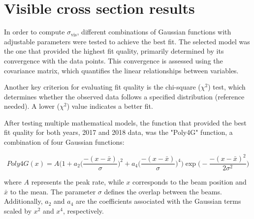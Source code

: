 \section{Visible cross section results}
\label{Visible cross section results}

In order to compute $\sigma_{\text{vis}}$, different combinations of Gaussian functions with adjustable parameters were tested to achieve the best fit. The selected model was the one that provided the highest fit quality, primarily determined by its convergence with the data points. This convergence is assessed using the covariance matrix, which quantifies the linear relationships between variables.

Another key criterion for evaluating fit quality is the chi-square ($\chi^2$) test, which determines whether the observed data follows a specified distribution (reference needed). A lower ($\chi^2$) value indicates a better fit.

After testing multiple mathematical models, the function that provided the best fit quality for both years, 2017 and 2018 data, was the "Poly4G" function, a combination of four Gaussian functions:


\begin{equation} 
Poly4G(x)= A \Biggl( 1+a_{2} \biggl( \frac{-(x-\bar{x})}{\sigma} \biggr)^{2} +a_{4} \biggl( \frac{-(x-\bar{x})}{\sigma} \biggr)^{4} \Biggr)\exp \Biggl( -\frac{-(x-\bar{x})^{2}}{2\sigma^{2}}\Biggr)
\end{equation}
 
\noindent where $A$ represents the peak rate, while $x$ corresponds to the beam position and $\bar{x}$ to the mean. The parameter $\sigma$ defines the overlap between the beams. Additionally, $a_{2}$ and $a_{4}$ are the coefficients associated with the Gaussian terms scaled by $x^2$ and $x^4$, respectively. 
 



